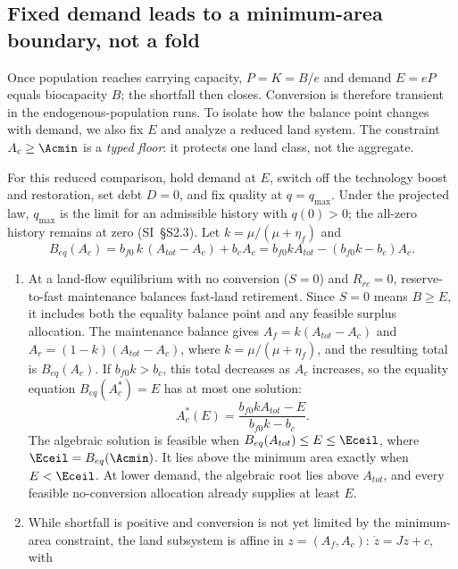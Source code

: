 \subsection{Fixed demand leads to a minimum-area boundary, not a fold}\label{sec:ceiling}

Once population reaches carrying capacity, $P=K=B/e$ and demand $E=eP$ equals biocapacity $B$; the shortfall then closes. Conversion is therefore transient in the endogenous-population runs. To isolate how the balance point changes with demand, we also fix $E$ and analyze a reduced land system. The constraint $A_c\ge\Acmin$ is a \emph{typed floor}: it protects one land class, not the aggregate.

\begin{proposition}\label{prop:ceiling}
For this reduced comparison, hold demand at $E$, switch off the technology boost and restoration, set debt $D=0$, and fix quality at $q=q_{\max}$. Under the projected law, $q_{\max}$ is the limit for an admissible history with $q(0)>0$; the all-zero history remains at zero (SI~\S S2.3). Let $k=\mu/(\mu+\eta_f)$ and
\begin{equation}\label{eq:Beq}
B_{eq}(A_c)=b_{f0}\,k\,(A_{tot}-A_c)+b_cA_c=b_{f0}kA_{tot}-(b_{f0}k-b_c)A_c .
\end{equation}
\begin{enumerate}[label=(\roman*)]
\item At a land-flow equilibrium with no conversion ($S=0$) and $R_{rc}=0$, reserve-to-fast maintenance balances fast-land retirement. Since $S=0$ means $B\ge E$, it includes both the equality balance point and any feasible surplus allocation. The maintenance balance gives $A_f=k(A_{tot}-A_c)$ and $A_r=(1-k)(A_{tot}-A_c)$, where $k=\mu/(\mu+\eta_f)$, and the resulting total is $B_{eq}(A_c)$. If $b_{f0}k>b_c$, this total decreases as $A_c$ increases, so the equality equation $B_{eq}(A_c^*)=E$ has at most one solution:
\begin{equation}\label{eq:Acstar}
A_c^*(E)=\frac{b_{f0}kA_{tot}-E}{b_{f0}k-b_c}.
\end{equation}
The algebraic solution is feasible when $B_{eq}(A_{tot})\le E\le\Eceil$, where $\Eceil=B_{eq}(\Acmin)$. It lies above the minimum area exactly when $E<\Eceil$. At lower demand, the algebraic root lies above $A_{tot}$, and every feasible no-conversion allocation already supplies at least $E$.
\item While shortfall is positive and conversion is not yet limited by the minimum-area constraint, the land subsystem is affine in $z=(A_f,A_c)$: $\dot z=Jz+c$, with

\end{enumerate}
\end{proposition}
